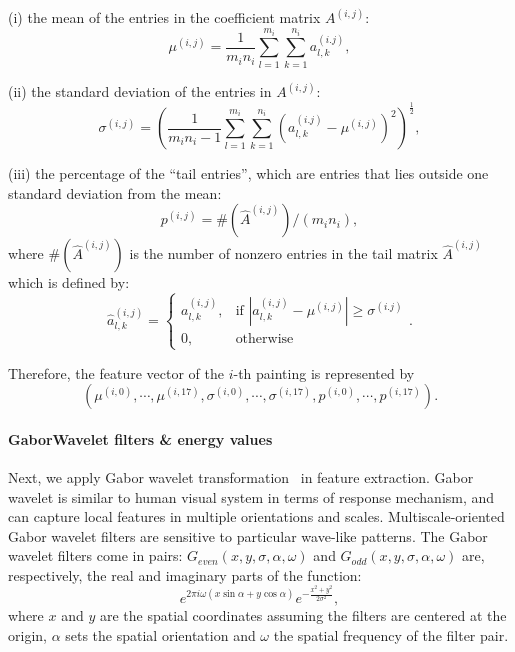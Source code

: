 \documentclass{article}
\begin{document}
(i) the mean of the entries in the coefficient matrix $A^{(i,j)}$:
\begin{equation}
\mu^{(i,j)} = \frac{1}{m_in_i}\sum_{l=1}^{m_i}\sum_{k=1}^{n_i}a_{l,k}^{(i.j)},
\end{equation}

(ii) the standard deviation of the entries in $A^{(i,j)}$:
\begin{equation}
\sigma^{(i,j)} = \left(\frac{1}{m_in_i-1}\sum_{l=1}^{m_i}\sum_{k=1}^{n_i}
\left(a_{l,k}^{(i.j)} - \mu^{(i,j)}
\right)^2\right)^{\frac{1}{2}},
\end{equation}

(iii) the percentage of the ``tail entries'', which are entries that lies outside one standard deviation from the mean:
\begin{equation}
p^{(i,j)} = \#(\hat{A}^{(i,j)})/(m_in_i),
\end{equation}
where $\#(\hat{A}^{(i,j)})$ is the number of nonzero entries in the tail matrix $\hat{A}^{(i,j)}$ which is defined by:
\begin{equation}
\hat{a}_{l,k}^{(i,j)} = 
\begin{cases}
a_{l,k}^{(i,j)}, & \text{if } |a_{l,k}^{(i,j)} - \mu^{(i,j)}|\geq\sigma^{(i.j)}\\
0, & \text{otherwise}
\end{cases}.
\end{equation}

Therefore, the feature vector of the $i$-th painting is represented by 
\begin{equation}
\left(
\mu^{(i,0)},\cdots,\mu^{(i,17)},
\sigma^{(i,0)},\cdots,\sigma^{(i,17)},
p^{(i,0)},\cdots,p^{(i,17)}
\right).
\end{equation}

\paragraph{GaborWavelet filters \& energy values}

Next, we apply Gabor wavelet transformation~\citep{johnson2008image} in feature extraction. 
Gabor wavelet is similar to human visual system in terms of response mechanism, 
and can capture local features in multiple orientations and scales. 
Multiscale-oriented Gabor wavelet filters are sensitive to particular wave-like patterns.
The Gabor wavelet filters come in pairs: $G_{even}(x,y,\sigma,\alpha,\omega)$ and $G_{odd}(x,y,\sigma,\alpha,\omega)$ are, 
respectively, the real and imaginary parts of the function:
\begin{equation}
e^{2\pi i\omega (x\sin\alpha+y\cos\alpha)}
e^{-\frac{x^2+y^2}{2\sigma^2}},
\end{equation}
where $x$ and $y$ are the spatial coordinates assuming the filters are centered at the origin, $\alpha$ sets the spatial orientation and $\omega$ the spatial frequency of the filter pair.
\end{document}
